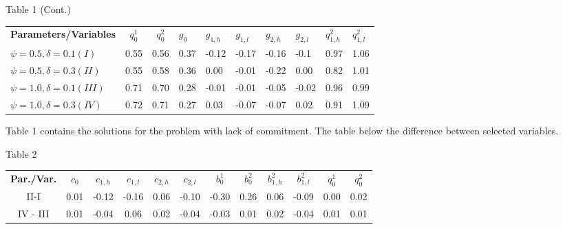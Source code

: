 \documentclass[11pt,letterpaper]{article}
\begin{document}
\newpage

\begin{center}
Table 1 (Cont.)
\end{center}


\begin{table}[!htbp]
\begin{tabular}{lcclllllll}
\textbf{Parameters/Variables} & $q_0^1$  & $q_0^2$  & $g_0$   & $g_{1,h}$   & $g_{1,l}$   & $g_{2,h}$  & $g_{2,l}$  &$ q_{1,h}^{2}$ & $ q_{1,l}^{2}$\\
$\psi=0.5,\delta=0.1 (I)$         & 0.55 & 0.56 & 0.37 & -0.12 & -0.17 & -0.16 & -0.1  & 0.97 & 1.06 \\
$\psi=0.5,\delta=0.3 (II)$        & 0.55 & 0.58 & 0.36 & 0.00    & -0.01 & -0.22 & 0.00     & 0.82 & 1.01 \\
$\psi=1.0,\delta=0.1 (III)$      & 0.71 & 0.70 & 0.28 & -0.01 & -0.01 & -0.05 & -0.02 & 0.96 & 0.99 \\
$\psi=1.0,\delta=0.3 (IV)$        & 0.72 & 0.71 & 0.27 & 0.03  & -0.07 & -0.07 & 0.02  & 0.91 & 1.09
\end{tabular}
\end{table}


\bigskip

Table 1 contains the solutions for the problem with lack of commitment. The table below the difference between selected variables.

\bigskip

\begin{center}
Table 2
\end{center}

\begin{table}[!htbp]
\begin{tabular}{cccccccccccc}
\multicolumn{1}{l}{\textbf{Par./Var.}} & $c_0$   & $c_{1,h}$   & $c_{1,l}$   & $c_{2,h}$  & $c_{2,l}$  & $b^{1}_{0}$   & $b^{2}_{0}$  & $b^{2}_{1,h}$ & $b^{2}_{1,l}$  & $q^{1}_{0}$  & $q^{2}_{0}$ \\
II-I                                              & 0.01 & -0.12 & -0.16 & 0.06 & -0.10 & -0.30 & 0.26 & 0.06 & -0.09 & 0.00 & 0.02 \\
IV - III                                          & 0.01 & -0.04 & 0.06  & 0.02 & -0.04 & -0.03 & 0.01 & 0.02 & -0.04 & 0.01 & 0.01
\end{tabular}
\end{table}


\bigskip
\end{document}
